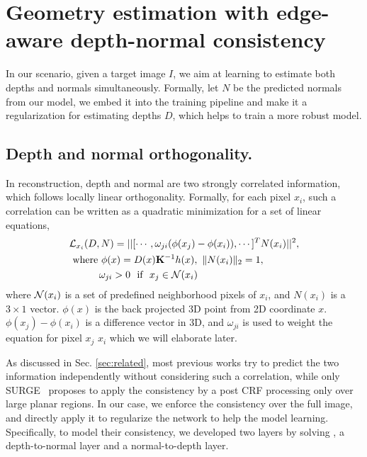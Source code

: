 \vspace{-0.7\baselineskip}
\section{Geometry estimation with edge-aware depth-normal consistency}
\label{sec:approach}
\vspace{-0.3\baselineskip}

In our scenario, given a target image $I$, we aim at learning to estimate both depths and normals simultaneously. Formally, let $N$ be the predicted normals from our model, we embed it into the training pipeline and make it a regularization for estimating depths $D$, which helps to train a more robust model.

\vspace{-0.5\baselineskip}
\subsection{Depth and normal orthogonality.}
\label{sub:depth_and_normal_orthogonality}
\vspace{-0.3\baselineskip}

In reconstruction, depth and normal are two strongly correlated information, which follows locally linear orthogonality. Formally, for each pixel $x_i$, such a correlation can be written as a quadratic minimization for a set of linear equations,
\begin{align}
\label{eq:orthognal}
&{\mathcal L}_{x_i}(D, N) = ||[\cdots,\omega_{ji}(\phi(x_j) - \phi(x_i)), \cdots]^T  N(x_i)||^2, \nonumber \\
&~\text{where~} \phi(x) = D(x){\mathbf K}^{-1}h(x), \text{~} \|N(x_i)\|_2 = 1, \nonumber\\
&~\text{~~~~~~~~} \omega_{ji} > 0 \text{~~if~~} x_j \in {\mathcal N}(x_i)
\end{align}
where ${\mathcal N}(x_i)$ is a set of predefined neighborhood pixels of $x_i$, and $N(x_i)$ is a $3 \times 1$ vector. $\phi(x)$ is the back projected 3D point from 2D coordinate $x$. $\phi(x_j) - \phi(x_i)$ is a difference vector in 3D, and $\omega_{ji}$ is used to weight the equation for pixel $x_j$ \wrt $x_i$ which we will elaborate later.

As discussed in Sec. \ref{sec:related}, most previous works try to predict the two information independently without considering such a correlation, while only SURGE~\cite{peng2016depth} proposes to apply the consistency by a post CRF processing only over large planar regions. In our case, we enforce the consistency over the full image, and directly apply it to regularize the network to help the model learning. Specifically, to model their consistency, we developed two layers by solving , \ie a depth-to-normal layer and a normal-to-depth layer. 

